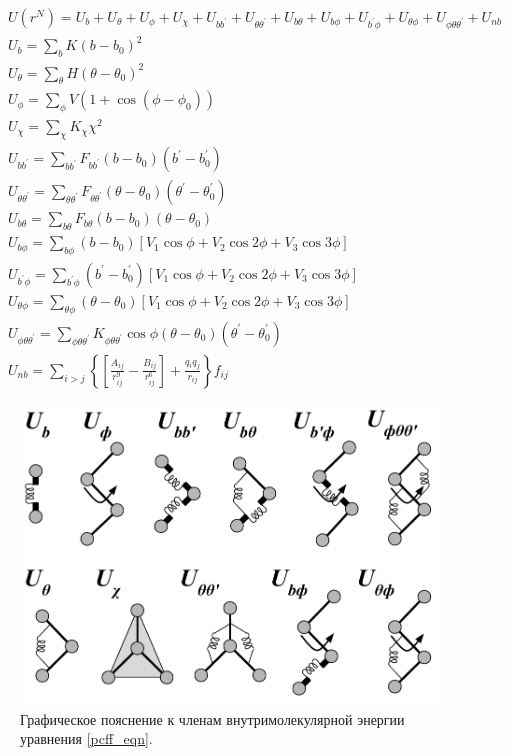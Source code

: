 \begin{eqnarray}
&&U(r^N)=U_{b}+U_{\theta}+U_{\phi}+U_{\chi}+U_{bb^\prime}+U_{\theta \theta^\prime}+U_{b\theta}+U_{b\phi}+U_{b^\prime \phi}+U_{\theta \phi}+U_{\phi \theta \theta^\prime}+U_{nb}  \nonumber \\
&&U_{b}=\sum_{b}K(b-b_0)^2\nonumber\\
&&U_{\theta}=\sum_{\theta}H(\theta-\theta_0)^2\nonumber\\
&&U_{\phi}=\sum_{\phi}V(1+\cos{(\phi-\phi_0)})\nonumber\\
&&U_{\chi}=\sum_{\chi}K_{\chi} \chi^2\nonumber\\
&&U_{bb^\prime}=\sum_{bb^\prime}F_{bb^\prime} (b-b_0)(b^\prime-b_0^\prime)\nonumber\\
&&U_{\theta\theta^\prime}=\sum_{\theta\theta^\prime}F_{\theta\theta ^\prime} (\theta-\theta_0)(\theta ^\prime-\theta _0^\prime)  \\  \label{pcff_eqn}
&&U_{b\theta}=\sum_{b\theta}F_{b\theta} (b-b_0)(\theta-\theta _0)\nonumber\\
&&U_{b\phi}=\sum_{b\phi}(b-b_0)[V_1\cos{\phi}+V_2\cos{2\phi}+V_3\cos{3\phi}]\nonumber\\
&&U_{b^\prime\phi}=\sum_{b^\prime\phi}(b^\prime-b^\prime_0)[V_1\cos{\phi}+V_2\cos{2\phi}+V_3\cos{3\phi}]\nonumber\\
&&U_{\theta\phi}=\sum_{\theta\phi}(\theta-\theta_0)[V_1\cos{\phi}+V_2\cos{2\phi}+V_3\cos{3\phi}]\nonumber\\
&&U_{\phi\theta\theta^\prime}=\sum_{\phi\theta\theta^\prime}K_{\phi\theta\theta^\prime}\cos{\phi(\theta-\theta_0)(\theta ^\prime-\theta _0^\prime)}\nonumber\\
&&U_{nb} = \sum_{i>j} \left \{ \left [ \frac { A_{ij} } { r_{ij}^9 } - \frac {B_{ij}} {r_{ij}^6} \right ]+ \frac{q_iq_j}  { r_{ij} } \right \} f_{ij}\nonumber
\end{eqnarray}

\begin{figure}[htbp]
  \centering
  \includegraphics[width=15cm]{images/2_pcff_terms}
     \caption{Графическое пояснение к членам внутримолекулярной энергии уравнения \ref{pcff_eqn}.}
  \label{fig:2_pcff_terms}
\end{figure}

